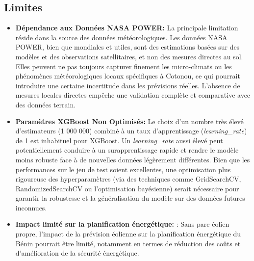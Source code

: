 \documentclass[12pt]{article}
\begin{document}
\subsection{Limites}
\begin{itemize}[label=$\color{blue}\dagger$]
	\item \textbf{Dépendance aux Données NASA POWER:} La principale limitation réside dans la source des données météorologiques. Les données NASA POWER, bien que mondiales et utiles, sont des estimations basées sur des modèles et des observations satellitaires, et non des mesures directes au sol. Elles peuvent ne pas toujours capturer finement les micro-climats ou les phénomènes météorologiques locaux spécifiques à Cotonou, ce qui pourrait introduire une certaine incertitude dans les prévisions réelles. L'absence de mesures locales directes empêche une validation complète et comparative avec des données terrain.
	\item \textbf{Paramètres XGBoost Non Optimisés:} Le choix d'un nombre très élevé d'estimateurs (1 000 000) combiné à un taux d'apprentissage (\textit{learning\_rate}) de 1 est inhabituel pour XGBoost. Un \textit{learning\_rate} aussi élevé peut potentiellement conduire à un surapprentissage rapide et rendre le modèle moins robuste face à de nouvelles données légèrement différentes. Bien que les performances sur le jeu de test soient excellentes, une optimisation plus rigoureuse des hyperparamètres (via des techniques comme GridSearchCV, RandomizedSearchCV ou l'optimisation bayésienne) serait nécessaire pour garantir la robustesse et la généralisation du modèle sur des données futures inconnues.
	\item \textbf{Impact limité sur la planification énergétique:} : Sans parc éolien propre, l’impact de la prévision éolienne sur la planification énergétique du Bénin pourrait être limité, notamment en termes de réduction des coûts et d’amélioration de la sécurité énergétique.
\end{itemize}
\end{document}
